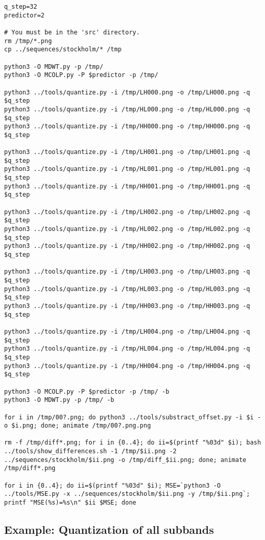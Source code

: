 \begin{verbatim}
q_step=32
predictor=2

# You must be in the 'src' directory.
rm /tmp/*.png
cp ../sequences/stockholm/* /tmp

python3 -O MDWT.py -p /tmp/
python3 -O MCOLP.py -P $predictor -p /tmp/

python3 ../tools/quantize.py -i /tmp/LH000.png -o /tmp/LH000.png -q $q_step
python3 ../tools/quantize.py -i /tmp/HL000.png -o /tmp/HL000.png -q $q_step
python3 ../tools/quantize.py -i /tmp/HH000.png -o /tmp/HH000.png -q $q_step

python3 ../tools/quantize.py -i /tmp/LH001.png -o /tmp/LH001.png -q $q_step
python3 ../tools/quantize.py -i /tmp/HL001.png -o /tmp/HL001.png -q $q_step
python3 ../tools/quantize.py -i /tmp/HH001.png -o /tmp/HH001.png -q $q_step

python3 ../tools/quantize.py -i /tmp/LH002.png -o /tmp/LH002.png -q $q_step
python3 ../tools/quantize.py -i /tmp/HL002.png -o /tmp/HL002.png -q $q_step
python3 ../tools/quantize.py -i /tmp/HH002.png -o /tmp/HH002.png -q $q_step

python3 ../tools/quantize.py -i /tmp/LH003.png -o /tmp/LH003.png -q $q_step
python3 ../tools/quantize.py -i /tmp/HL003.png -o /tmp/HL003.png -q $q_step
python3 ../tools/quantize.py -i /tmp/HH003.png -o /tmp/HH003.png -q $q_step

python3 ../tools/quantize.py -i /tmp/LH004.png -o /tmp/LH004.png -q $q_step
python3 ../tools/quantize.py -i /tmp/HL004.png -o /tmp/HL004.png -q $q_step
python3 ../tools/quantize.py -i /tmp/HH004.png -o /tmp/HH004.png -q $q_step

python3 -O MCOLP.py -P $predictor -p /tmp/ -b
python3 -O MDWT.py -p /tmp/ -b

for i in /tmp/00?.png; do python3 ../tools/substract_offset.py -i $i -o $i.png; done; animate /tmp/00?.png.png

rm -f /tmp/diff*.png; for i in {0..4}; do ii=$(printf "%03d" $i); bash ../tools/show_differences.sh -1 /tmp/$ii.png -2 ../sequences/stockholm/$ii.png -o /tmp/diff_$ii.png; done; animate /tmp/diff*.png

for i in {0..4}; do ii=$(printf "%03d" $i); MSE=`python3 -O ../tools/MSE.py -x ../sequences/stockholm/$ii.png -y /tmp/$ii.png`; printf "MSE(%s)=%s\n" $ii $MSE; done
\end{verbatim}


\subsection{Example: Quantization of all subbands}

